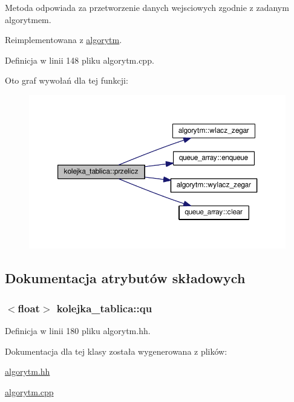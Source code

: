 Metoda odpowiada za przetworzenie danych wejsciowych zgodnie z zadanym algorytmem. 



Reimplementowana z \hyperlink{classalgorytm_af3f92bf537b1f2e1f93173983e838449}{algorytm}.



Definicja w linii 148 pliku algorytm.\-cpp.



Oto graf wywołań dla tej funkcji\-:\nopagebreak
\begin{figure}[H]
\begin{center}
\leavevmode
\includegraphics[width=350pt]{classkolejka__tablica_aad6baa28ce61111666e70df7d6ac4f86_cgraph}
\end{center}
\end{figure}




\subsection{Dokumentacja atrybutów składowych}
\hypertarget{classkolejka__tablica_a7fd15c7c7a0fa3649042ec634b2b8d4f}{
\subsubsection[{qu}]{$<$float$>$ kolejka\-\_\-tablica\-::qu\hspace{0.3cm}{\ttfamily [private]}}}\label{classkolejka__tablica_a7fd15c7c7a0fa3649042ec634b2b8d4f}


Definicja w linii 180 pliku algorytm.\-hh.



Dokumentacja dla tej klasy została wygenerowana z plików\-:\begin{DoxyCompactItemize}
\item 
\hyperlink{algorytm_8hh}{algorytm.\-hh}\item 
\hyperlink{algorytm_8cpp}{algorytm.\-cpp}\end{DoxyCompactItemize}
